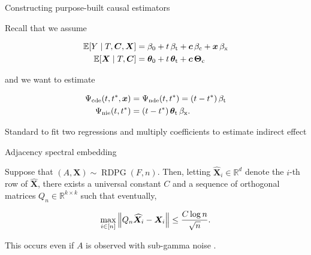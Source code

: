 \documentclass{beamer}
\theoremstyle{remark}
\renewcommand{\c}{\bm c}
\newcommand{\x}{\bm x}
\newcommand{\C}{\bm C}
\newcommand{\X}{\bm X}
\newcommand{\Xhat}{\widehat{\X}}
\newcommand \R {\mathbb{R}}
\newcommand{\thetazero}{\bm \theta_0}
\newcommand{\thetat}{\bm \theta_\text{t}}
\newcommand{\Thetac}{\bm \Theta_\text{c}}
\newcommand{\betazero}{\beta_0}
\newcommand{\betat}{\beta_\text{t}}
\newcommand{\betac}{\beta_\text{c}}
\newcommand{\betax}{\beta_\text{x}}
\newcommand{\cde}{\Psi_\text{cde} \paren*{t, t^*, \x}}
\newcommand{\nde}{\Psi_\text{nde} \paren*{t, t^*}}
\newcommand{\nie}{\Psi_\text{nie} \paren*{t, t^*}}
\newcommand{\RDPG}{\operatorname{RDPG}}
\newcommand \dist {\sim}
\DeclarePairedDelimiter{\paren}{(}{)}
\DeclarePairedDelimiter{\brac}{[}{]}
\DeclarePairedDelimiter{\norm}{\lVert}{\rVert}
\newcommand{\E}[2][]{%
   \ifthenelse{ \equal{#1}{} }
      {\ensuremath{\mathbb{E} \brac*{#2}}}
      {\ensuremath{\mathbb{E} \brac*{#2 \mid #1}}}
}
\begin{document}
\begin{frame}{Constructing purpose-built causal estimators}

    Recall that we assume

    \begin{align*}
        \E[T, \C, \X]{Y}
         & = \betazero
        + t \, \betat
        + \c \, \betac
        + \x \, \betax  \\
        \E[T, \C]{\X}
         & = \thetazero
        + t \, \thetat
        + \c \, \Thetac
    \end{align*}

    and we want to estimate

    \begin{align*}
        \cde & = \nde = \paren*{t - t^*} \, \betat      \\
        \nie & = \paren*{t - t^*} \, \thetat \, \betax.
    \end{align*}

    Standard to fit two regressions and multiply coefficients to estimate indirect effect \citep{vanderweele_mediation_2014}

\end{frame}

\begin{frame}{Adjacency spectral embedding}

    \begin{lemma}
        \label{lem:2toinfty}

        Suppose that $(A, \X) \dist \RDPG(F,n)$. Then, letting $\Xhat_i \in \R^d$ denote the $i$-th row of $\Xhat$, there exists a universal constant $C$ and a sequence of orthogonal matrices $Q_n \in \R^{k \times k}$ such that eventually,

        \begin{equation*}
            \max_{i \in [n]} \, \norm*{Q_n \Xhat_i - \X_i} \le \frac{C \log n}{\sqrt n}.
        \end{equation*}

        This occurs even if $A$ is observed with sub-gamma noise \citep{levin_recovering_2022}.

    \end{lemma}
\end{frame}
\end{document}
